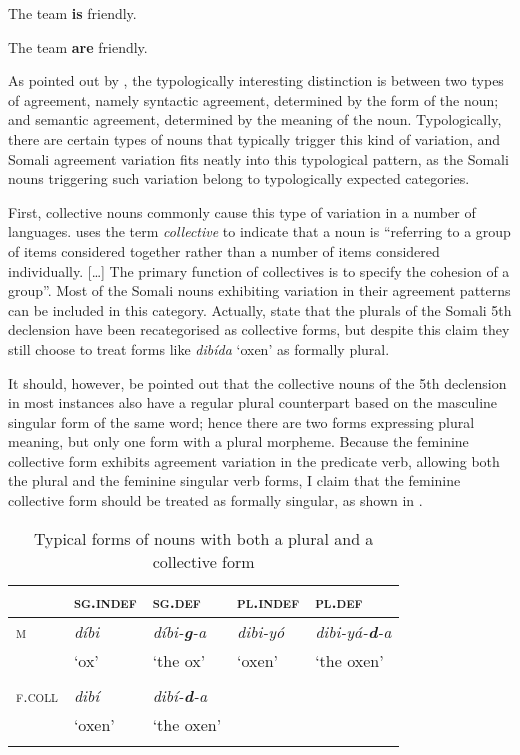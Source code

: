 \documentclass[output=paper]{langsci/langscibook}
\begin{document}
\ea\label{ex:nilsson:6} 
\ea\label{ex:nilsson:6a} The team \textbf{is} friendly.

\ex\label{ex:nilsson:6b}
 The team \textbf{are} friendly.
\z
\z

As pointed out by \citet[187]{Corbett2000}, the typologically interesting distinction is between two types of agreement, namely syntactic agreement, determined by the form of the noun; and semantic agreement, determined by the meaning of the noun. Typologically, there are certain types of nouns that typically trigger this kind of variation, and Somali agreement variation fits neatly into this typological pattern, as the Somali nouns triggering such variation belong to typologically expected categories.

First, collective nouns commonly cause this type of variation in a number of languages. \citet[118–119]{Corbett2000} uses the term \textit{collective} to indicate that a noun is “referring to a group of items considered together rather than a number of items considered individually. […] The primary function of collectives is to specify the cohesion of a group”. Most of the Somali nouns exhibiting variation in their agreement patterns can be included in this category. Actually, \citet[82]{Siyaad1984} state that the plurals of the Somali 5th declension have been recategorised as collective forms, but despite this claim they still choose to treat forms like \textit{dibída} ‘oxen’ as formally plural.

It should, however, be pointed out that the collective nouns of the 5th declension in most instances also have a regular plural counterpart based on the masculine singular form of the same word; hence there are two forms expressing plural meaning, but only one form with a plural morpheme. Because the feminine collective form exhibits agreement variation in the predicate verb, allowing both the plural and the feminine singular verb forms, I claim that the feminine collective form should be treated as formally singular, as shown in .
 
\begin{table}
\caption{Typical forms of nouns with both a plural and a collective form}
\label{tab:nilsson:9}

\begin{tabularx}{\textwidth}{XXXXX} 
\lsptoprule
& {\textsc{sg.indef}} & {\textsc{sg.def}} & {\textsc{pl.indef}} & {\textsc{pl.def}}\\
\midrule
{\textsc{m}} & 
\textit{díbi}  & 
{\textit{díbi-}\textbf{\textit{g}}\textit{-a}}  & {\textit{dibi-yó}}  & {\textit{dibi-yá-}\textbf{\textit{d}}\textit{-a}}  \\
& ‘ox’ & {‘the ox’} & {‘oxen’} & {‘the oxen’} \\
\\ 

{\textsc{f.coll}} & {\textit{dibí}} 
  & {\textit{dibí-}\textbf{\textit{d}}\textit{-a}} \\

& {‘oxen’} &  {‘the oxen’} 
\\
\lspbottomrule
\end{tabularx}
\end{table} 
\end{document}
